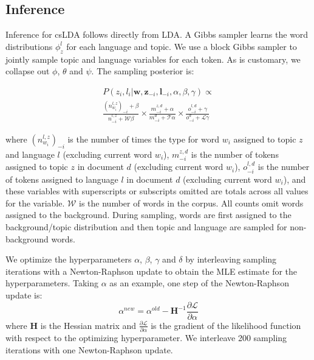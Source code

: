 \documentclass[11pt]{article}
\begin{document}
\subsection{Inference}
Inference for csLDA follows directly from LDA. A Gibbs sampler learns the
word distributions $\phi_z^l$ for each language and topic. We use a block Gibbs sampler
to jointly sample topic and language variables for each token.
As is customary, we collapse out $\phi$, $\theta$ and $\psi$.
The sampling posterior is:
\begin{small}
\begin{eqnarray}
P(z_i,l_i | \mathbf{w},\mathbf{z}_{-i},\mathbf{l}_{-i},  \alpha, \beta, \gamma) \propto   \nonumber \\
\frac{(n_{w_i}^{l,z})_{ -i} + \beta}{n_{ -i}^{l,z} + \mathcal{W}\beta} \times \frac{m^{z,d}_{ -i} + \alpha}{m^{d}_{ -i} + \mathcal{T}\alpha} \times \frac{o^{l,d}_{ -i} + \gamma}{o^{d}_{ -i} + \mathcal{L}\gamma}
\end{eqnarray}
\end{small}
\noindent where $(n_{w_i}^{l,z})_{ -i}$ is the number of times the type for word $w_i$ assigned to topic $z$ and language $l$ (excluding current word $w_i$),
$m^{z,d}_{ -i}$ is the number of tokens assigned to topic $z$ in document $d$ (excluding current word $w_i$),
$o^{l,d}_{ -i}$ is the number of tokens assigned to language $l$ in document $d$ (excluding current word $w_i$),
and these variables with superscripts or subscripts omitted are totals across all values for the variable. $\mathcal{W}$ is the number of words in the corpus.
All counts omit words assigned to the background.
During sampling, words are first assigned to the background/topic distribution and then topic and language are sampled for non-background words.

We optimize the hyperparameters $\alpha$, $\beta$, $\gamma$ and $\delta$ by interleaving sampling iterations with a Newton-Raphson update to obtain
the MLE estimate for the hyperparameters. Taking $\alpha$ as an example, one step of the Newton-Raphson update is: 
\begin{equation}
\alpha^{new} =\alpha^{old}-\mathbf{H}^{-1}\frac{\partial \mathcal{L}}{\partial \alpha} 
\end{equation}
where $\mathbf{H}$ is the Hessian matrix and $\frac{\partial \mathcal{L}}{\partial \alpha} $ is the gradient of the likelihood function with respect to the optimizing hyperparameter. 
We interleave 200 sampling iterations with one Newton-Raphson update.
\end{document}
